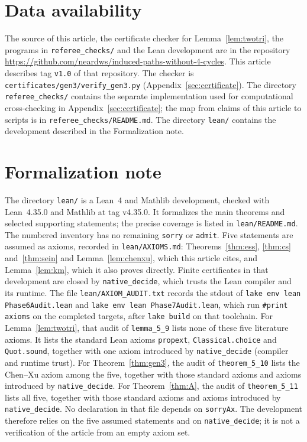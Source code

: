 \documentclass[ASNA]{USG}
\theoremstyle{WBstyletwo}
\numberwithin{equation}{section}
\begin{document}
\section*{Data availability}
The source of this article, the certificate checker for Lemma~\ref{lem:twotri}, the programs in \texttt{referee\_checks/} and the Lean development are in the repository \url{https://github.com/neardws/induced-paths-without-4-cycles}. This article describes tag \texttt{v1.0} of that repository. The checker is \texttt{certificates/gen3/verify\_gen3.py} (Appendix~\ref{sec:certificate}). The directory \texttt{referee\_checks/} contains the separate implementation used for computational cross-checking in Appendix~\ref{sec:certificate}; the map from claims of this article to scripts is in \texttt{referee\_checks/README.md}. The directory \texttt{lean/} contains the development described in the Formalization note.

\section*{Formalization note}
The directory \texttt{lean/} is a Lean~4 and Mathlib development, checked with Lean~4.35.0 and Mathlib at tag v4.35.0. It formalizes the main theorems and selected supporting statements; the precise coverage is listed in \texttt{lean/README.md}. The numbered inventory has no remaining \texttt{sorry} or \texttt{admit}. Five statements are assumed as axioms, recorded in \texttt{lean/AXIOMS.md}: Theorems~\ref{thm:ess}, \ref{thm:cs} and~\ref{thm:sein} and Lemma~\ref{lem:chenxu}, which this article cites, and Lemma~\ref{lem:km}, which it also proves directly. Finite certificates in that development are closed by \texttt{native\_decide}, which trusts the Lean compiler and its runtime. The file \texttt{lean/AXIOM\_AUDIT.txt} records the stdout of \texttt{lake env lean Phase6Audit.lean} and \texttt{lake env lean Phase7Audit.lean}, which run \texttt{\#print axioms} on the completed targets, after \texttt{lake build} on that toolchain. For Lemma~\ref{lem:twotri}, that audit of \texttt{lemma\_5\_9} lists none of these five literature axioms. It lists the standard Lean axioms \texttt{propext}, \texttt{Classical.choice} and \texttt{Quot.sound}, together with one axiom introduced by \texttt{native\_decide} (compiler and runtime trust). For Theorem~\ref{thm:gen3}, the audit of \texttt{theorem\_5\_10} lists the Chen--Xu axiom among the five, together with those standard axioms and axioms introduced by \texttt{native\_decide}. For Theorem~\ref{thm:A}, the audit of \texttt{theorem\_5\_11} lists all five, together with those standard axioms and axioms introduced by \texttt{native\_decide}. No declaration in that file depends on \texttt{sorryAx}. The development therefore relies on the five assumed statements and on \texttt{native\_decide}; it is not a verification of the article from an empty axiom set.
\end{document}
